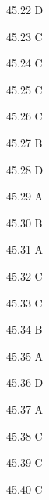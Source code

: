 \begin{Solution}{45.{22}}
D
\end{Solution}
\begin{Solution}{45.{23}}
C
\end{Solution}
\begin{Solution}{45.{24}}
C
\end{Solution}
\begin{Solution}{45.{25}}
C
\end{Solution}
\begin{Solution}{45.{26}}
C
\end{Solution}
\begin{Solution}{45.{27}}
B
\end{Solution}
\begin{Solution}{45.{28}}
D
\end{Solution}
\begin{Solution}{45.{29}}
A
\end{Solution}
\begin{Solution}{45.{30}}
B
\end{Solution}
\begin{Solution}{45.{31}}
A
\end{Solution}
\begin{Solution}{45.{32}}
C
\end{Solution}
\begin{Solution}{45.{33}}
C
\end{Solution}
\begin{Solution}{45.{34}}
B
\end{Solution}
\begin{Solution}{45.{35}}
A
\end{Solution}
\begin{Solution}{45.{36}}
D
\end{Solution}
\begin{Solution}{45.{37}}
A
\end{Solution}
\begin{Solution}{45.{38}}
C
\end{Solution}
\begin{Solution}{45.{39}}
C
\end{Solution}
\begin{Solution}{45.{40}}
C
\end{Solution}
